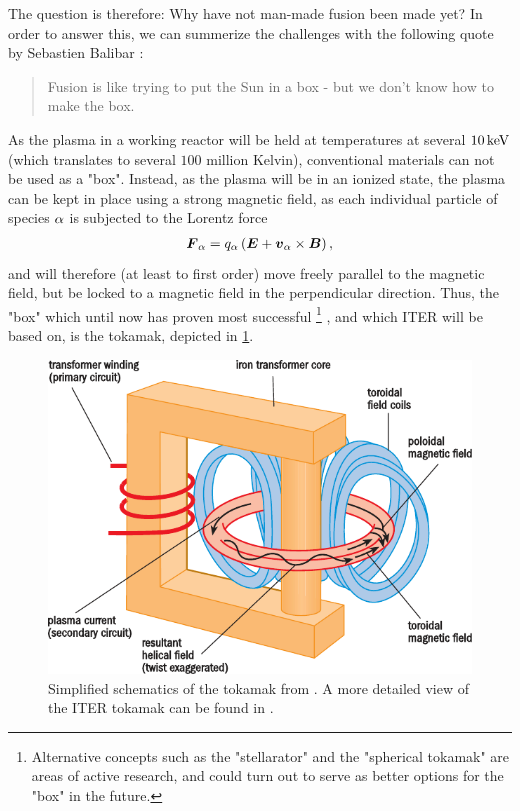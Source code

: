 The question is therefore: Why have not man-made fusion been made yet?
In order to answer this, we can summerize the challenges with the following quote by Sebastien Balibar \cite{Balibar2009Web}:
%
\begin{quote}
    Fusion is like trying to put the Sun in a box - but we don't know how to make the box.
\end{quote}
%
As the plasma in a working reactor will be held at temperatures at several $10 \, \text{keV}$ (which translates to several $100$ million Kelvin), conventional materials can not be used as a "box".
Instead, as the plasma will be in an ionized state, the plasma can be kept in place using a strong magnetic field, as each individual particle of species $\alpha$ is subjected to the Lorentz force
%
\begin{align*}
    \boldsymbol{F}_\alpha = q_\alpha \left(\boldsymbol{E} + \boldsymbol{v}_\alpha\times\boldsymbol{B}\right),
\end{align*}
%
and will therefore (at least to first order) move freely parallel to the magnetic field, but be locked to a magnetic field in the perpendicular direction.
Thus, the "box" which until now has proven most successful%
%
\footnote{Alternative concepts such as the "stellarator" and the "spherical tokamak" are areas of active research, and could turn out to serve as better options for the "box" in the future.}
%
, and which ITER will be based on, is the tokamak, depicted in \cref{fig:tokamak}.
%
\begin{figure}[htb]
    \begin{center}
        \includegraphics{fig/intro/tokamak}
    \end{center}
    \caption{Simplified schematics of the tokamak from \cite{nuttall2008}.
        A more detailed view of the ITER tokamak can be found in \cite{ITERWeb}.}
    \label{fig:tokamak}
\end{figure}

